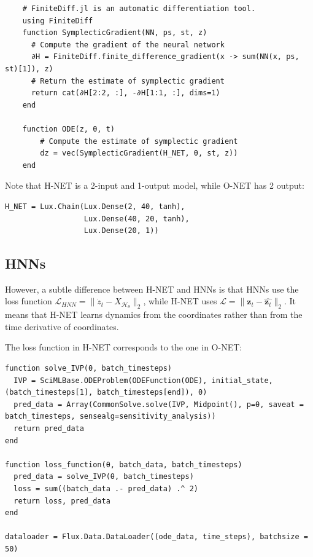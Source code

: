 \documentclass[
	parskip, 			   %
	twoside, 			   %
	DIV=14, 			   %
	BCOR=15.0mm, 		   %
	headsepline, 		   %
	open=right, 		   %
	captions=tableheading, %
	bibliography=totoc,    %
	numbers=noenddot       %
]{scrreprt}
\begin{document}
\begin{verbatim}
    # FiniteDiff.jl is an automatic differentiation tool.
    using FiniteDiff
    function SymplecticGradient(NN, ps, st, z) 
      # Compute the gradient of the neural network
      ∂H = FiniteDiff.finite_difference_gradient(x -> sum(NN(x, ps, st)[1]), z)
      # Return the estimate of symplectic gradient
      return cat(∂H[2:2, :], -∂H[1:1, :], dims=1)
    end

    function ODE(z, θ, t)
        # Compute the estimate of symplectic gradient
        dz = vec(SymplecticGradient(H_NET, θ, st, z))
    end
\end{verbatim}

Note that H-NET is a 2-input and 1-output model, while O-NET has 2 output:

\begin{verbatim}
H_NET = Lux.Chain(Lux.Dense(2, 40, tanh),
                  Lux.Dense(40, 20, tanh),
                  Lux.Dense(20, 1))
\end{verbatim}

\subsection{HNNs}
However, a subtle difference between H-NET and HNNs is that HNNs use the loss function $\mathcal{L}_{HNN} = \lVert \dot z_{t} - X_{\mathcal{H}_{\theta}} \rVert_{2}$, while H-NET uses $\mathcal{L} = \lVert \mathbf{z}_{t} - \hat{\mathbf{z}_{t}} \rVert_{2}$. It means that H-NET learns dynamics from the coordinates rather than from the time derivative of coordinates.

The loss function in H-NET corresponds to the one in O-NET:

\begin{verbatim}
function solve_IVP(θ, batch_timesteps)
  IVP = SciMLBase.ODEProblem(ODEFunction(ODE), initial_state, (batch_timesteps[1], batch_timesteps[end]), θ)
  pred_data = Array(CommonSolve.solve(IVP, Midpoint(), p=θ, saveat = batch_timesteps, sensealg=sensitivity_analysis))
  return pred_data
end

function loss_function(θ, batch_data, batch_timesteps)
  pred_data = solve_IVP(θ, batch_timesteps)
  loss = sum((batch_data .- pred_data) .^ 2)
  return loss, pred_data
end

dataloader = Flux.Data.DataLoader((ode_data, time_steps), batchsize = 50)
\end{verbatim}
\end{document}
